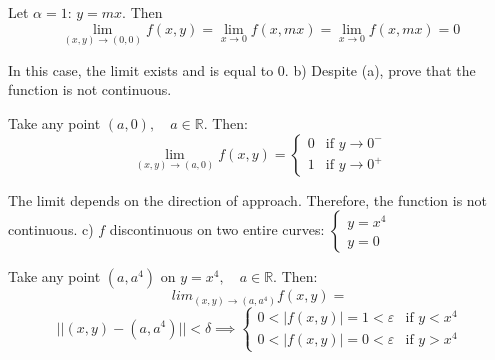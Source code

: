 \documentclass[11pt]{article}
\begin{document}
\begin{center}
\end{center}

Let $\alpha = 1$: $y = mx$. Then
\[
\lim_{(x,y) \to (0,0)} f(x,y) = \lim_{x \to 0} f(x,mx) = \lim_{x \to 0} f(x,mx) = 0
\]

In this case, the limit exists and is equal to 0.
\vskip 0.5cm
b) Despite (a), prove that the function is not continuous.

Take any point $(a,0), \quad a \in \mathbb{R}$. Then:
\[
\lim_{(x,y) \to (a,0)} f(x,y) = 
\begin{cases}
    0 & \text{if } y \to 0^- \\
    1 & \text{if } y \to 0^+
\end{cases}
\]

The limit depends on the direction of approach. Therefore, the function is not continuous.
\vskip 0.5cm
c) $f$ discontinuous on two entire curves:
$\begin{cases}
    y = x^4 \\
    y = 0
\end{cases}$

Take any point $(a,a^4)$ on $y = x^4, \quad a \in \mathbb{R}$. Then:
\[
lim_{(x,y) \to (a,a^4)} f(x,y) = 
\]
\[
||(x,y) - (a,a^4)|| < \delta \implies
\begin{cases}
    0 < |f(x,y)| = 1 < \varepsilon & \text{if } y < x^4 \\
    0 < |f(x,y)| = 0 < \varepsilon & \text{if } y > x^4
\end{cases}
\]
\end{document}
